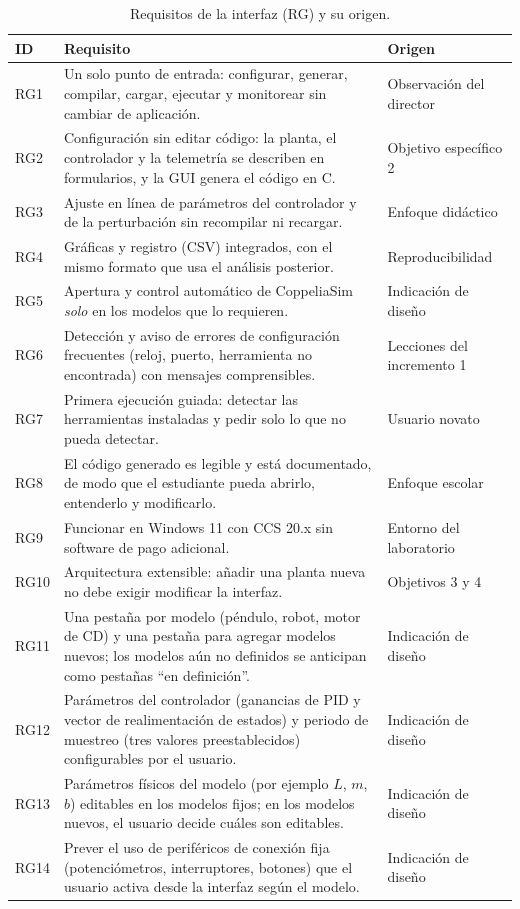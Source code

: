 \documentclass[12pt,letterpaper]{article}
\begin{document}
\begin{table}[!htbp]
\centering
\caption{Requisitos de la interfaz (RG) y su origen.}
\label{tab:rg}
\begin{tabularx}{\textwidth}{>{\raggedright\arraybackslash}p{1.1cm}Y>{\raggedright\arraybackslash}p{4.0cm}}
\toprule
\textbf{ID} & \textbf{Requisito} & \textbf{Origen} \\
\midrule
RG1 & Un solo punto de entrada: configurar, generar, compilar, cargar, ejecutar y monitorear sin cambiar de aplicación. & Observación del director \\
RG2 & Configuración sin editar código: la planta, el controlador y la telemetría se describen en formularios, y la GUI genera el código en C. & Objetivo específico 2 \\
RG3 & Ajuste en línea de parámetros del controlador y de la perturbación sin recompilar ni recargar. & Enfoque didáctico \\
RG4 & Gráficas y registro (CSV) integrados, con el mismo formato que usa el análisis posterior. & Reproducibilidad \\
RG5 & Apertura y control automático de CoppeliaSim \emph{solo} en los modelos que lo requieren. & Indicación de diseño \\
RG6 & Detección y aviso de errores de configuración frecuentes (reloj, puerto, herramienta no encontrada) con mensajes comprensibles. & Lecciones del incremento 1 \\
RG7 & Primera ejecución guiada: detectar las herramientas instaladas y pedir solo lo que no pueda detectar. & Usuario novato \\
RG8 & El código generado es legible y está documentado, de modo que el estudiante pueda abrirlo, entenderlo y modificarlo. & Enfoque escolar \\
RG9 & Funcionar en Windows 11 con CCS 20.x sin software de pago adicional. & Entorno del laboratorio \\
RG10 & Arquitectura extensible: añadir una planta nueva no debe exigir modificar la interfaz. & Objetivos 3 y 4 \\
RG11 & Una pestaña por modelo (péndulo, robot, motor de CD) y una pestaña para agregar modelos nuevos; los modelos aún no definidos se anticipan como pestañas ``en definición''. & Indicación de diseño \\
RG12 & Parámetros del controlador (ganancias de PID y vector de realimentación de estados) y periodo de muestreo (tres valores preestablecidos) configurables por el usuario. & Indicación de diseño \\
RG13 & Parámetros físicos del modelo (por ejemplo $L$, $m$, $b$) editables en los modelos fijos; en los modelos nuevos, el usuario decide cuáles son editables. & Indicación de diseño \\
RG14 & Prever el uso de periféricos de conexión fija (potenciómetros, interruptores, botones) que el usuario activa desde la interfaz según el modelo. & Indicación de diseño \\
\bottomrule
\end{tabularx}
\end{table}
\end{document}
